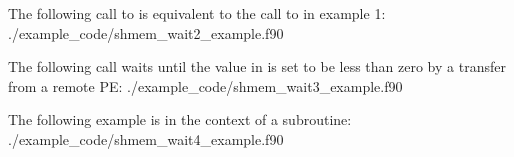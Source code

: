 \begin{apidefinition}
\begin{apiexamples}
\apifexample
{ The following call to  is  equivalent to the
call to  in example 1:}
{./example_code/shmem_wait2_example.f90}
{}

\apicexample
{The following \CorCpp{} call waits until the value in  is set to
be less than zero by a transfer from a remote PE:}
{./example_code/shmem_wait3_example.f90}
{}

\apifexample
{The following \Fortran example is in the context of a subroutine:}
{./example_code/shmem_wait4_example.f90}
{}

\end{apiexamples}

\end{apidefinition}
